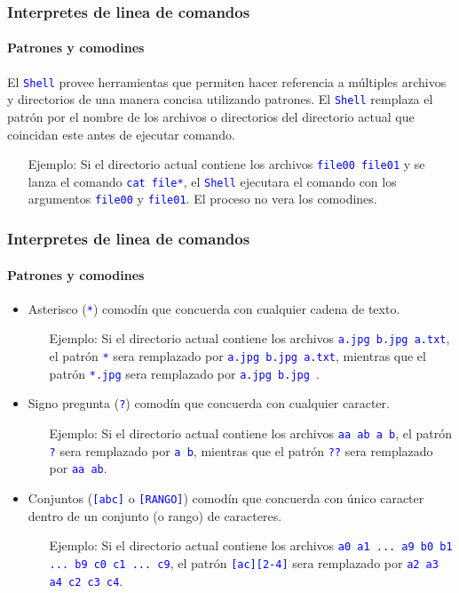 \documentclass[11pt,a4paper,spanish]{beamer}
\newcommand{\cw}[1]{\mbox{\texttt{\textcolor{blue}{#1}}}}
\begin{document}
\begin{frame}

    \frametitle{Interpretes de linea de comandos}
    \framesubtitle{Patrones y comodines}

    El \cw{Shell} provee herramientas que permiten hacer referencia a
    múltiples archivos y directorios de una manera concisa utilizando
    patrones. El \cw{Shell} remplaza el patrón por el nombre de los
    archivos o directorios del directorio actual que coincidan este antes de
    ejecutar comando.

    \begin{itemize}
        \item[Ejemplo:] Si el directorio actual contiene los archivos
            \cw{file00 file01} y se lanza el comando
            \cw{cat file*}, el \cw{Shell} ejecutara el comando con
            los argumentos \cw{file00} y \cw{file01}. El proceso
            no vera los comodines.
    \end{itemize}

\end{frame}

\begin{frame}

    \frametitle{Interpretes de linea de comandos}
    \framesubtitle{Patrones y comodines}

    \begin{itemize}
        \item Asterisco (\cw{*}) comodín que concuerda con cualquier
            cadena de texto.
        \begin{itemize}
            \item[Ejemplo:] Si el directorio actual contiene los archivos
                \cw{a.jpg b.jpg a.txt}, el patrón \cw{*} sera
                remplazado por \cw{a.jpg b.jpg a.txt}, mientras que el
                patrón \cw{*.jpg} sera remplazado por \cw{a.jpg
                b.jpg }.\pause
        \end{itemize}
        \item Signo pregunta (\cw{?}) comodín que concuerda con
            cualquier caracter.
        \begin{itemize}
            \item[Ejemplo:] Si el directorio actual contiene los archivos
                \cw{aa ab a b}, el patrón \cw{?} sera remplazado
                por \cw{a b}, mientras que el patrón \cw{??} sera
                remplazado por \cw{aa ab}.\pause
        \end{itemize}
        \item Conjuntos (\cw{[abc]} o \cw{[RANGO]}) comodín que concuerda con
            único caracter dentro de un conjunto (o rango) de caracteres.
        \begin{itemize}
            \item[Ejemplo:] Si el directorio actual contiene los archivos
                \cw{a0 a1 ... a9 b0 b1 ... b9 c0 c1 ... c9}, el patrón
                \cw{[ac][2-4]} sera remplazado por \cw{a2 a3 a4 c2
                c3 c4}.
        \end{itemize}
    \end{itemize}

\end{frame}
\end{document}
